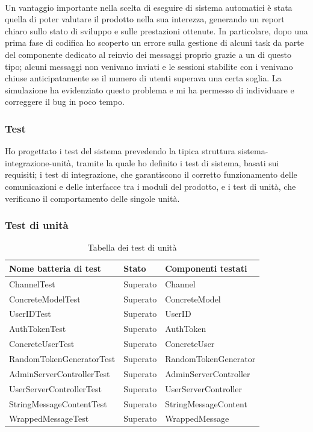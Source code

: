		\paragraph*{}
		Un vantaggio importante nella scelta di eseguire  di sistema automatici è stata quella di poter valutare il prodotto nella sua interezza, generando un report chiaro sullo stato di sviluppo e sulle prestazioni ottenute. In particolare, dopo una prima fase di codifica ho scoperto un errore sulla gestione di alcuni task da parte del componente dedicato al reinvio dei messaggi proprio grazie a un  di questo tipo; alcuni messaggi non venivano inviati e le sessioni stabilite con i  venivano chiuse anticipatamente se il numero di utenti superava una certa soglia. La simulazione ha evidenziato questo problema e mi ha permesso di individuare e correggere il bug in poco tempo.
		
		\subsubsection{Test}
		Ho progettato i test del sistema prevedendo la tipica struttura sistema-integrazione-unità, tramite la quale ho definito i test di sistema, basati sui requisiti; i test di integrazione, che garantiscono il corretto funzionamento delle comunicazioni e delle interfacce tra i moduli del prodotto, e i test di unità, che verificano il comportamento delle singole unità.
		\subsubsection{Test di unità}
		\begin{table}[H]
			\centering
			\begin{tabularx}{\textwidth}{ X X X }
				\toprule
				\textbf{Nome batteria di test} & \textbf{Stato} & \textbf{Componenti testati} \\
				\midrule
				ChannelTest 					& Superato  & Channel 					\\ 
				ConcreteModelTest 			& Superato 	& ConcreteModel 			\\
				UserIDTest 						& Superato 	& UserID 					\\
				AuthTokenTest 					& Superato 	& AuthToken 				\\
				ConcreteUserTest 				& Superato 	& ConcreteUser 			\\
				RandomTokenGeneratorTest 	& Superato 	& RandomTokenGenerator 	\\
				AdminServerControllerTest 	& Superato 	& AdminServerController \\
				UserServerControllerTest 	& Superato  & UserServerController 	\\ 			  
				StringMessageContentTest 	& Superato  & StringMessageContent 	\\ 
				WrappedMessageTest 			& Superato 	& WrappedMessage 			\\
			\end{tabularx}
			\caption{Tabella dei test di unità}	
		\end{table}

